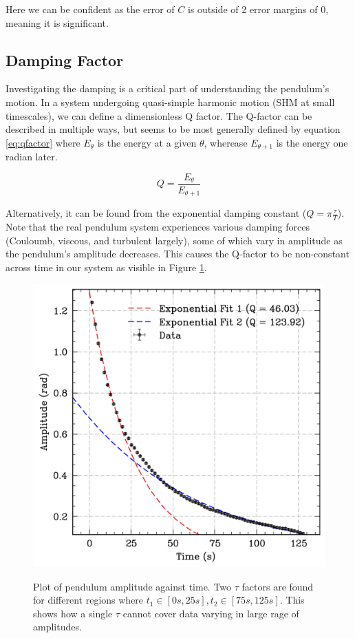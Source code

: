 \documentclass[prl,twocolumn,amsmath,amssymb,superscriptaddress]{revtex4-2}
\begin{document}
Here we can be confident as the error of $C$ is outside of 2 error margins of 0, meaning it is significant.


\subsection{Damping Factor}

Investigating the damping is a critical part of understanding the pendulum's motion. In a system undergoing quasi-simple harmonic motion (SHM at small timescales), we can define a dimensionless Q factor. The Q-factor can be described in multiple ways, but seems to be most generally defined by equation \ref{eq:qfactor} where $E_\theta$ is the energy at a given $\theta$, wherease $E_{\theta+1}$ is the energy one radian later.

\begin{equation}
    Q=\frac{E_{\theta}}{E_{\theta+1}}
    \label{eq:qfactor}
\end{equation}

Alternatively, it can be found from the exponential damping constant ($Q=\pi\frac{\tau}{T}$). Note that the real pendulum system experiences various damping forces (Couloumb, viscous, and turbulent largely), some of which vary in amplitude as the pendulum's amplitude decreases. This causes the Q-factor to be non-constant across time in our system as visible in Figure \ref{fig:decay}.

\begin{figure}[htb]
    \includegraphics[width=0.8\linewidth]{decay.png}
    \label{fig:decay}
    \caption{Plot of pendulum amplitude against time. Two $\tau$ factors are found for different regions where $t_1\in[0s,25s], t_2\in[75s,125s]$. This shows how a single $\tau$ cannot cover data varying in large rage of amplitudes.}
\end{figure}
\end{document}
